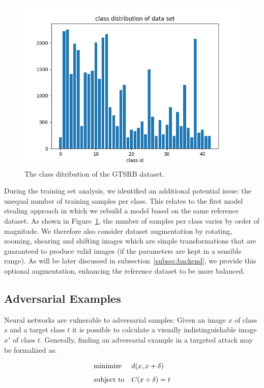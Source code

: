\begin{figure}
	\includegraphics[width=1.1\linewidth]{figs/class_distr}
	\caption{The class ditribution of the GTSRB dataset.}
	\label{fig:class_distr}
\end{figure}

During the training set analysis, we identified an additional potential issue: the unequal number of training samples per class.
This relates to the first model stealing approach in which we rebuild a model based on the same reference dataset.
As shown in Figure~\ref{fig:class_distr}, the number of samples per class varies by order of magnitude.
We therefore also consider dataset augmentation by rotating, zooming, shearing and shifting images which are simple transformations that are guaranteed to produce valid images (if the parameters are kept in a sensible range).
As will be later discussed in subsection~\ref{subsec:backend}, we provide this optional augmentation, enhancing the reference dataset to be more balanced.

\subsection{Adversarial Examples}

Neural networks are vulnerable to adversarial samples: Given an image $x$ of class $s$ and a target class $t$ it is possible to calculate a visually indistinguishable image $x'$ of class $t$. Generally, finding an adversarial example in a targeted attack may be formalized as:

\begin{equation}
\label{eq:general_opt}
\begin{aligned} & \underset{}{\text{minimize}} & & d(x, x+\delta) \\ & \text{subject to} & & C(x + \delta) = t \end{aligned}
\end{equation}


